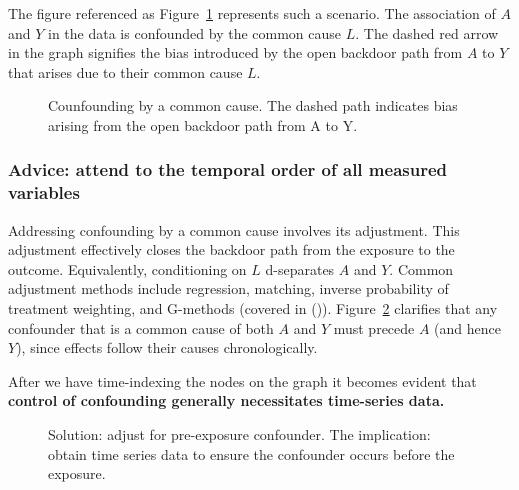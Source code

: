 \documentclass[
  singlecolumn]{article}
\begin{document}
The figure referenced as Figure~\ref{fig-dag-common-cause} represents
such a scenario. The association of \(A\) and \(Y\) in the data is
confounded by the common cause \(L\). The dashed red arrow in the graph
signifies the bias introduced by the open backdoor path from \(A\) to
\(Y\) that arises due to their common cause \(L\).

\begin{figure}[htb]


\caption{\label{fig-dag-common-cause}Counfounding by a common cause. The
dashed path indicates bias arising from the open backdoor path from A to
Y.}

\end{figure}%

\subsubsection{Advice: attend to the temporal order of all measured
variables}\label{advice-attend-to-the-temporal-order-of-all-measured-variables}

Addressing confounding by a common cause involves its adjustment. This
adjustment effectively closes the backdoor path from the exposure to the
outcome. Equivalently, conditioning on \(L\) d-separates \(A\) and
\(Y\). Common adjustment methods include regression, matching, inverse
probability of treatment weighting, and G-methods (covered in
()).
Figure~\ref{fig-dag-common-cause-solution} clarifies that any confounder
that is a common cause of both \(A\) and \(Y\) must precede \(A\) (and
hence \(Y\)), since effects follow their causes chronologically.

After we have time-indexing the nodes on the graph it becomes evident
that \textbf{control of confounding generally necessitates time-series
data.}

\begin{figure}[htb]


\caption{\label{fig-dag-common-cause-solution}Solution: adjust for
pre-exposure confounder. The implication: obtain time series data to
ensure the confounder occurs before the exposure.}

\end{figure}%
\end{document}
